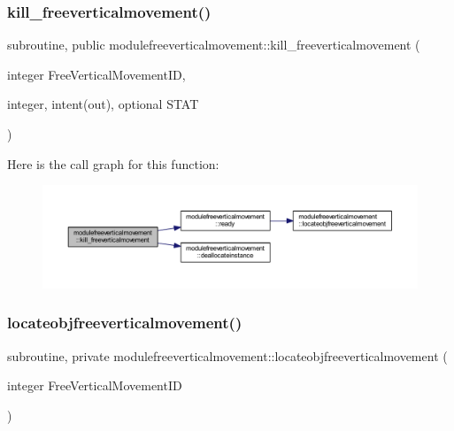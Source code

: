 \subsubsection{\texorpdfstring{kill\+\_\+freeverticalmovement()}{kill\_freeverticalmovement()}}
{\footnotesize\ttfamily subroutine, public modulefreeverticalmovement\+::kill\+\_\+freeverticalmovement (\begin{DoxyParamCaption}\item[{integer}]{Free\+Vertical\+Movement\+ID,  }\item[{integer, intent(out), optional}]{S\+T\+AT }\end{DoxyParamCaption})}

Here is the call graph for this function\+:\nopagebreak
\begin{figure}[H]
\begin{center}
\leavevmode
\includegraphics[width=350pt]{namespacemodulefreeverticalmovement_a73edd544e82908b2861ea9c544516ab3_cgraph}
\end{center}
\end{figure}
\mbox{\label{namespacemodulefreeverticalmovement_a5b77a0a606cd82e8b48959c866cc4029}} 
\subsubsection{\texorpdfstring{locateobjfreeverticalmovement()}{locateobjfreeverticalmovement()}}
{\footnotesize\ttfamily subroutine, private modulefreeverticalmovement\+::locateobjfreeverticalmovement (\begin{DoxyParamCaption}\item[{integer}]{Free\+Vertical\+Movement\+ID }\end{DoxyParamCaption})\hspace{0.3cm}{\ttfamily [private]}}

